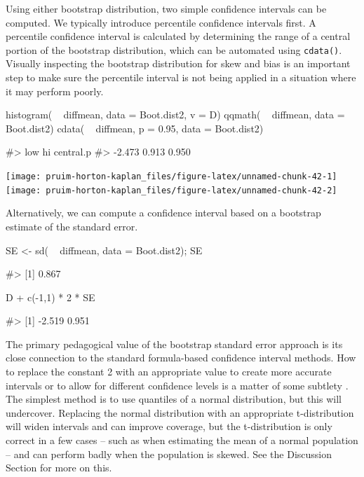 Using either bootstrap distribution, two simple confidence intervals can
be computed. We typically introduce percentile confidence intervals
first. A percentile confidence interval is calculated by determining the
range of a central portion of the bootstrap distribution, which can be
automated using \texttt{cdata()}. Visually inspecting the bootstrap
distribution for skew and bias is an important step to make sure the
percentile interval is not being applied in a situation where it may
perform poorly.

\begin{Schunk}
\begin{Sinput}
histogram( ~ diffmean, data = Boot.dist2, v = D)
qqmath( ~ diffmean, data = Boot.dist2)
cdata( ~ diffmean, p = 0.95, data = Boot.dist2)
\end{Sinput}
\begin{Soutput}
#>       low        hi central.p 
#>    -2.473     0.913     0.950
\end{Soutput}


\begin{center}\texttt{[image: pruim-horton-kaplan\_files/figure-latex/unnamed-chunk-42-1]} \texttt{[image: pruim-horton-kaplan\_files/figure-latex/unnamed-chunk-42-2]} \end{center}

\end{Schunk}

Alternatively, we can compute a confidence interval based on a bootstrap
estimate of the standard error.

\begin{Schunk}
\begin{Sinput}
SE <- sd( ~ diffmean, data = Boot.dist2); SE
\end{Sinput}
\begin{Soutput}
#> [1] 0.867
\end{Soutput}
\begin{Sinput}
D + c(-1,1) * 2 * SE
\end{Sinput}
\begin{Soutput}
#> [1] -2.519  0.951
\end{Soutput}
\end{Schunk}

\noindent
The primary pedagogical value of the bootstrap standard error approach
is its close connection to the standard formula-based confidence
interval methods. How to replace the constant 2 with an appropriate
value to create more accurate intervals or to allow for different
confidence levels is a matter of some subtlety \citep{Hesterberg:2015}.
The simplest method is to use quantiles of a normal distribution, but
this will undercover. Replacing the normal distribution with an
appropriate t-distribution will widen intervals and can improve
coverage, but the t-distribution is only correct in a few cases -- such
as when estimating the mean of a normal population -- and can perform
badly when the population is skewed. See the Discussion Section for more
on this.

